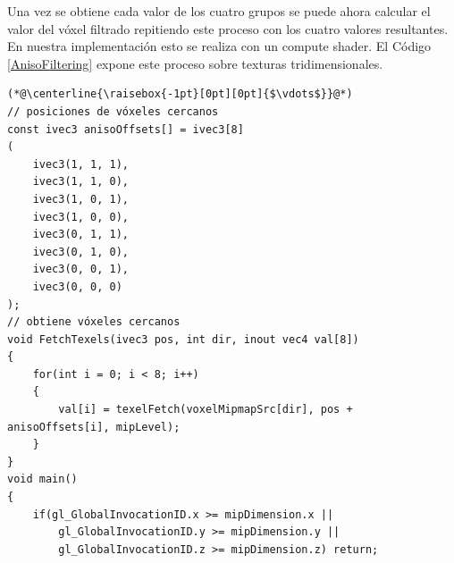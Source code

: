 Una vez se obtiene cada valor de los cuatro grupos se puede ahora calcular el valor del vóxel filtrado repitiendo este proceso con los cuatro valores resultantes. En nuestra implementación esto se realiza con un compute shader. El Código \ref{AnisoFiltering} expone este proceso sobre texturas tridimensionales.
\\
\begin{lstlisting}[caption={Filtrado sobre los volúmenes direccionales para obtener vóxeles anisótropos}, label=AnisoFiltering]
(*@\centerline{\raisebox{-1pt}[0pt][0pt]{$\vdots$}}@*)
// posiciones de vóxeles cercanos
const ivec3 anisoOffsets[] = ivec3[8]
(
	ivec3(1, 1, 1),
	ivec3(1, 1, 0),
	ivec3(1, 0, 1),
	ivec3(1, 0, 0),
	ivec3(0, 1, 1),
	ivec3(0, 1, 0),
	ivec3(0, 0, 1),
	ivec3(0, 0, 0)
);
// obtiene vóxeles cercanos
void FetchTexels(ivec3 pos, int dir, inout vec4 val[8]) 
{
	for(int i = 0; i < 8; i++)
	{
		val[i] = texelFetch(voxelMipmapSrc[dir], pos + anisoOffsets[i], mipLevel);
	}
}
void main()
{
	if(gl_GlobalInvocationID.x >= mipDimension.x ||
		gl_GlobalInvocationID.y >= mipDimension.y ||
		gl_GlobalInvocationID.z >= mipDimension.z) return;


\end{lstlisting}
